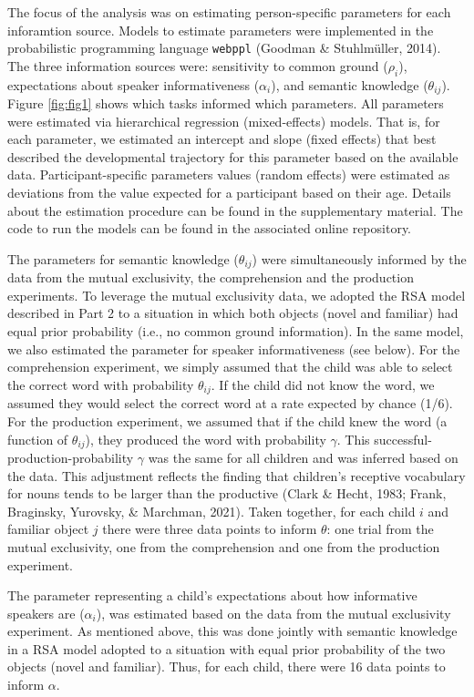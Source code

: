 \documentclass[
  man,floatsintext]{apa6}
\begin{document}
The focus of the analysis was on estimating person-specific parameters for each inforamtion source. Models to estimate parameters were implemented in the probabilistic programming language \texttt{webppl} (Goodman \& Stuhlmüller, 2014). The three information sources were: sensitivity to common ground (\(\rho_i\)), expectations about speaker informativeness (\(\alpha_i\)), and semantic knowledge (\(\theta_{ij}\)). Figure \ref{fig:fig1} shows which tasks informed which parameters. All parameters were estimated via hierarchical regression (mixed-effects) models. That is, for each parameter, we estimated an intercept and slope (fixed effects) that best described the developmental trajectory for this parameter based on the available data. Participant-specific parameters values (random effects) were estimated as deviations from the value expected for a participant based on their age. Details about the estimation procedure can be found in the supplementary material. The code to run the models can be found in the associated online repository.

The parameters for semantic knowledge (\(\theta_{ij}\)) were simultaneously informed by the data from the mutual exclusivity, the comprehension and the production experiments. To leverage the mutual exclusivity data, we adopted the RSA model described in Part 2 to a situation in which both objects (novel and familiar) had equal prior probability (i.e., no common ground information). In the same model, we also estimated the parameter for speaker informativeness (see below). For the comprehension experiment, we simply assumed that the child was able to select the correct word with probability \(\theta_{ij}\). If the child did not know the word, we assumed they would select the correct word at a rate expected by chance (1/6). For the production experiment, we assumed that if the child knew the word (a function of \(\theta_{ij}\)), they produced the word with probability \(\gamma\). This successful-production-probability \(\gamma\) was the same for all children and was inferred based on the data. This adjustment reflects the finding that children's receptive vocabulary for nouns tends to be larger than the productive (Clark \& Hecht, 1983; Frank, Braginsky, Yurovsky, \& Marchman, 2021). Taken together, for each child \(i\) and familiar object \(j\) there were three data points to inform \(\theta\): one trial from the mutual exclusivity, one from the comprehension and one from the production experiment.

The parameter representing a child's expectations about how informative speakers are (\(\alpha_i\)), was estimated based on the data from the mutual exclusivity experiment. As mentioned above, this was done jointly with semantic knowledge in a RSA model adopted to a situation with equal prior probability of the two objects (novel and familiar). Thus, for each child, there were 16 data points to inform \(\alpha\).
\end{document}
